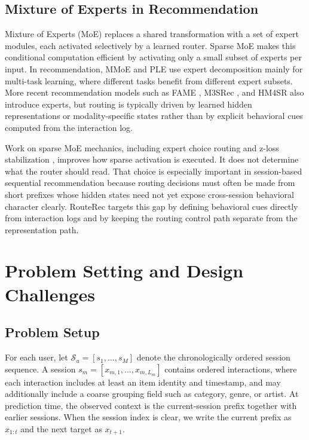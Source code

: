 \documentclass[sigconf,review,anonymous]{acmart}
\begin{document}
\subsection{Mixture of Experts in Recommendation}
Mixture of Experts (MoE) \cite{jacobs1991adaptive,jordan1994hme} replaces a shared transformation with a set of expert modules, each activated selectively by a learned router. Sparse MoE \cite{shazeer2017moe,fedus2022switch} makes this conditional computation efficient by activating only a small subset of experts per input. In recommendation, MMoE \cite{ma2018mmoe} and PLE \cite{tang2020ple} use expert decomposition mainly for multi-task learning, where different tasks benefit from different expert subsets. More recent recommendation models such as FAME \cite{liu2025fame}, M3SRec \cite{bian2023m3srec}, and HM4SR \cite{zhang2025hm4sr} also introduce experts, but routing is typically driven by learned hidden representations or modality-specific states rather than by explicit behavioral cues computed from the interaction log.

Work on sparse MoE mechanics, including expert choice routing \cite{zhou2022expertchoice} and z-loss stabilization \cite{zoph2022stmoe}, improves how sparse activation is executed. It does not determine what the router should read. That choice is especially important in session-based sequential recommendation because routing decisions must often be made from short prefixes whose hidden states need not yet expose cross-session behavioral character clearly. RouteRec targets this gap by defining behavioral cues directly from interaction logs and by keeping the routing control path separate from the representation path.

\section{Problem Setting and Design Challenges}
\label{sec:problem}

\subsection{Problem Setup}
For each user, let $\mathcal{S}_u=[s_1,\dots,s_M]$ denote the chronologically ordered session sequence. A session $s_m=[x_{m,1},\dots,x_{m,L_m}]$ contains ordered interactions, where each interaction includes at least an item identity and timestamp, and may additionally include a coarse grouping field such as category, genre, or artist. At prediction time, the observed context is the current-session prefix together with earlier sessions. When the session index is clear, we write the current prefix as $x_{1:t}$ and the next target as $x_{t+1}$.
\end{document}
